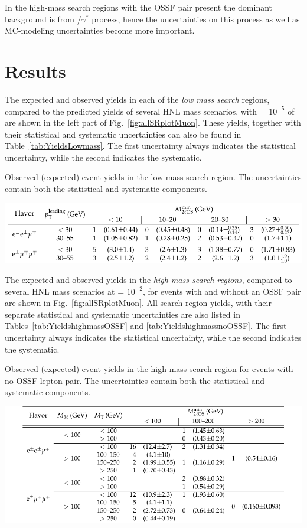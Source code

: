 In the high-mass search regions with the OSSF pair present the dominant background is from \PW\PZ/\PW$\gamma^*$ process, hence
the uncertainties on this process as well as MC-modeling uncertainties become more important.

\section{Results}

The expected and observed yields in each of the \emph{low mass search}
regions, compared to the predicted yields of several HNL mass
scenarios, with \mixpar = $10^{-5}$ of are shown in the left part of
Fig.~\ref{fig:allSRplotMuon}. These yields, together with their
statistical and systematic uncertainties can also be found in
Table~\ref{tab:YieldsLowmass}. The first uncertainty always indicates the statistical uncertainty, while the second indicates the systematic.


\begin{table}[tbh]
\centering
\caption{Observed (expected) event yields in the low-mass search region. The uncertainties
contain both the statistical and systematic components. }
\label{tab:YieldsLowmass}
\includegraphics[width=0.6\linewidth]{Figures/c5/tables/CMS-EXO-17-012_Table_0A1.pdf}
\end{table}

The expected and observed yields in the \emph{high mass search regions},
compared to several HNL mass scenarios at \mixpar = $10^{-2}$, for
events with and without an OSSF pair are shown in Fig.~\ref{fig:allSRplotMuon}. All search region yields, with their separate statistical and systematic uncertainties are also listed in Tables~\ref{tab:YieldshighmassOSSF} and \ref{tab:YieldshighmassnoOSSF}. The first uncertainty always indicates the statistical uncertainty, while the second indicates the systematic.
\begin{table}[tbh]
\centering
\caption{Observed (expected) event yields in the high-mass search region for events with no
OSSF lepton pair. The uncertainties contain both the statistical and systematic components.}
\label{tab:YieldshighmassOSSF}
\includegraphics[width=0.7\linewidth]{Figures/c5/tables/CMS-EXO-17-012_Table_0A2.pdf}
\end{table}

